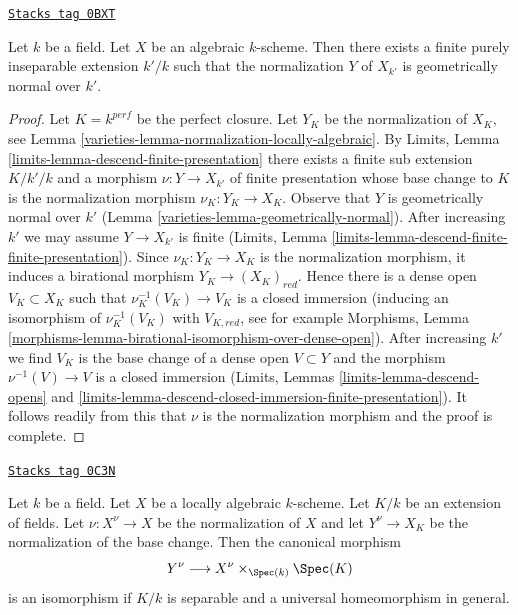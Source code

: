 \begin{lemma}
\label{varieties-lemma-finite-extension-geometrically-normal}
\href{https://stacks.math.columbia.edu/tag/0BXT}{\texttt{Stacks tag 0BXT}}

Let $k$ be a field. Let $X$ be an algebraic $k$-scheme.
Then there exists a finite purely inseparable extension $k'/k$
such that the normalization $Y$ of $X_{k'}$ is geometrically normal over $k'$.
\end{lemma}

\begin{proof}

Let $K = k^{perf}$ be the perfect closure. Let $Y_K$ be the
normalization of $X_K$, see Lemma \ref{varieties-lemma-normalization-locally-algebraic}.
By Limits, Lemma \ref{limits-lemma-descend-finite-presentation}
there exists a finite sub extension $K/k'/k$ and a morphism
$\nu : Y \to X_{k'}$ of finite presentation whose base change to $K$
is the normalization morphism $\nu_K : Y_K \to X_K$.
Observe that $Y$ is geometrically normal over $k'$
(Lemma \ref{varieties-lemma-geometrically-normal}).
After increasing $k'$ we may assume $Y \to X_{k'}$ is finite
(Limits, Lemma \ref{limits-lemma-descend-finite-finite-presentation}).
Since $\nu_K : Y_K \to X_K$ is the normalization morphism,
it induces a birational morphism $Y_K \to (X_K)_{red}$.
Hence there is a dense open $V_K \subset X_K$ such that
$\nu_K^{-1}(V_K) \to V_K$ is a closed immersion
(inducing an isomorphism of $\nu_K^{-1}(V_K)$ with $V_{K, red}$, see
for example Morphisms, Lemma
\ref{morphisms-lemma-birational-isomorphism-over-dense-open}).
After increasing $k'$ we find $V_K$ is the base change of a dense open
$V \subset Y$ and the morphism $\nu^{-1}(V) \to V$ is a closed immersion
(Limits, Lemmas \ref{limits-lemma-descend-opens} and
\ref{limits-lemma-descend-closed-immersion-finite-presentation}).
It follows readily from this that $\nu$ is the normalization
morphism and the proof is complete.
\end{proof}

\begin{lemma}
\label{varieties-lemma-normalization-and-change-of-fields}
\href{https://stacks.math.columbia.edu/tag/0C3N}{\texttt{Stacks tag 0C3N}}

Let $k$ be a field. Let $X$ be a locally algebraic $k$-scheme.
Let $K/k$ be an extension of fields. Let $\nu : X^\nu \to X$
be the normalization of $X$ and let $Y^\nu \to X_K$ be the
normalization of the base change. Then the canonical morphism
$$
Y^\nu \longrightarrow X^\nu \times_{\Spec(k)} \Spec(K)
$$
is an isomorphism if $K/k$ is separable and a universal homeomorphism
in general.
\end{lemma}

